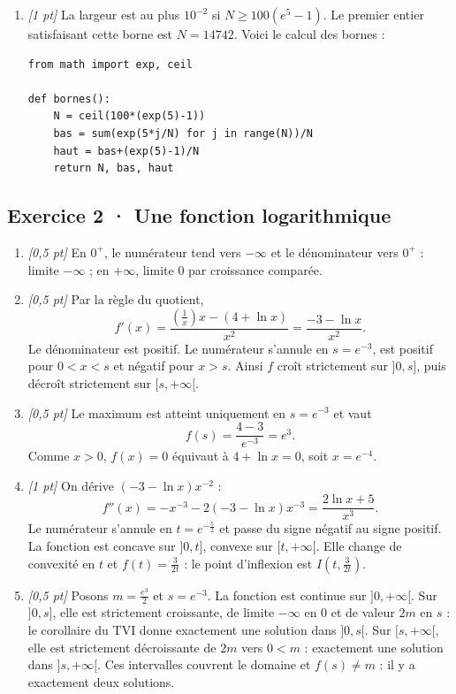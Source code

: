 \begin{enumerate}

\item \textit{[1 pt]} La largeur est au plus $10^{-2}$ si $N\ge100(e^{5}-1)$. Le premier entier satisfaisant cette borne est $N=14742$. Voici le calcul des bornes :
\begin{lstlisting}
from math import exp, ceil

def bornes():
    N = ceil(100*(exp(5)-1))
    bas = sum(exp(5*j/N) for j in range(N))/N
    haut = bas+(exp(5)-1)/N
    return N, bas, haut
\end{lstlisting}


\end{enumerate}

\subsection*{Exercice 2 · Une fonction logarithmique}\begin{enumerate}

\item \textit{[0,5 pt]} En $0^+$, le numérateur tend vers $-\infty$ et le dénominateur vers $0^+$ : limite $-\infty$ ; en $+\infty$, limite $0$ par croissance comparée.

\item \textit{[0,5 pt]} Par la règle du quotient,
\[f'(x)=\frac{(\frac{1}{x})x-(4+\ln x)}{x^2}=\frac{-3-\ln x}{x^2}.\]
Le dénominateur est positif. Le numérateur s'annule en $s=e^{-3}$, est positif pour $0<x<s$ et négatif pour $x>s$. Ainsi $f$ croît strictement sur $]0,s]$, puis décroît strictement sur $[s,+\infty[$.

\item \textit{[0,5 pt]} Le maximum est atteint uniquement en $s=e^{-3}$ et vaut
\[f(s)=\frac{4- 3}{e^{-3}}=e^{3}.\]
Comme $x>0$, $f(x)=0$ équivaut à $4+\ln x=0$, soit $x=e^{-4}$.

\item \textit{[1 pt]} On dérive $(-3-\ln x)x^{-2}$ :
\[f''(x)=-x^{-3}-2(-3-\ln x)x^{-3}=\frac{2\ln x+5}{x^3}.\]
Le numérateur s'annule en $t=e^{-\frac{5}{2}}$ et passe du signe négatif au signe positif. La fonction est concave sur $]0,t]$, convexe sur $[t,+\infty[$. Elle change de convexité en $t$ et $f(t)=\frac{3}{2t}$ : le point d'inflexion est $I(t,\frac{3}{2t})$.

\item \textit{[0,5 pt]} Posons $m=\frac{e^{3}}{2}$ et $s=e^{-3}$. La fonction est continue sur $]0,+\infty[$. Sur $]0,s]$, elle est strictement croissante, de limite $-\infty$ en $0$ et de valeur $2m$ en $s$ : le corollaire du TVI donne exactement une solution dans $]0,s[$. Sur $[s,+\infty[$, elle est strictement décroissante de $2m$ vers $0<m$ : exactement une solution dans $]s,+\infty[$. Ces intervalles couvrent le domaine et $f(s)\ne m$ : il y a exactement deux solutions.


\end{enumerate}
